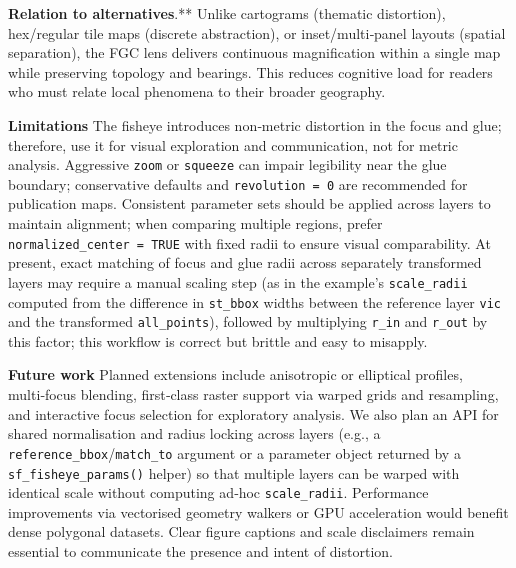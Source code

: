 \textbf{Relation to alternatives}.** Unlike cartograms (thematic distortion), hex/regular tile maps (discrete abstraction), or inset/multi‑panel layouts (spatial separation), the FGC lens delivers continuous magnification within a single map while preserving topology and bearings. This reduces cognitive load for readers who must relate local phenomena to their broader geography.

\textbf{Limitations} The fisheye introduces non‑metric distortion in the focus and glue; therefore, use it for visual exploration and communication, not for metric analysis. Aggressive \texttt{zoom} or \texttt{squeeze} can impair legibility near the glue boundary; conservative defaults and \texttt{revolution\ =\ 0} are recommended for publication maps. Consistent parameter sets should be applied across layers to maintain alignment; when comparing multiple regions, prefer \texttt{normalized\_center\ =\ TRUE} with fixed radii to ensure visual comparability. At present, exact matching of focus and glue radii across separately transformed layers may require a manual scaling step (as in the example's \texttt{scale\_radii} computed from the difference in \texttt{st\_bbox} widths between the reference layer \texttt{vic} and the transformed \texttt{all\_points}), followed by multiplying \texttt{r\_in} and \texttt{r\_out} by this factor; this workflow is correct but brittle and easy to misapply.

\textbf{Future work} Planned extensions include anisotropic or elliptical profiles, multi‑focus blending, first‑class raster support via warped grids and resampling, and interactive focus selection for exploratory analysis. We also plan an API for shared normalisation and radius locking across layers (e.g., a \texttt{reference\_bbox}/\texttt{match\_to} argument or a parameter object returned by a \texttt{sf\_fisheye\_params()} helper) so that multiple layers can be warped with identical scale without computing ad‑hoc \texttt{scale\_radii}. Performance improvements via vectorised geometry walkers or GPU acceleration would benefit dense polygonal datasets. Clear figure captions and scale disclaimers remain essential to communicate the presence and intent of distortion.



\address{%
Thanh Cuong Nguyen\\
Monash University\\%
Department of Econometrics and Business Statistics\\ Melbourne, Australia\\
%
\url{https://alex-nguyen-vn.github.io}\\%
\textit{ORCiD: \href{https://orcid.org/0000-0000-0000-0000}{0000-0000-0000-0000}}\\%
\href{mailto:thanhcuong10091992@gmail.com}{\nolinkurl{thanhcuong10091992@gmail.com}}%
}


